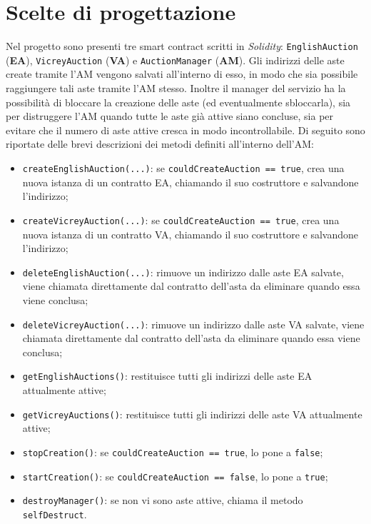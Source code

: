 \section{Scelte di progettazione}
Nel progetto sono presenti tre smart contract scritti in \textit{Solidity}: \texttt{EnglishAuction} (\textbf{EA}), \texttt{VicreyAuction} (\textbf{VA}) e \texttt{AuctionManager} (\textbf{AM}).
Gli indirizzi delle aste create tramite l'AM vengono salvati all'interno di esso, in modo che sia possibile raggiungere tali aste tramite l'AM stesso. Inoltre il manager del servizio ha la possibilità di bloccare la creazione delle aste (ed eventualmente sbloccarla), sia per distruggere l'AM quando tutte le aste già attive siano concluse, sia per evitare che il numero di aste attive cresca in modo incontrollabile. Di seguito sono riportate delle brevi descrizioni dei metodi definiti all'interno dell'AM:
\begin{itemize}
	\item \texttt{createEnglishAuction(...)}: se \texttt{couldCreateAuction == true}, crea una nuova istanza di un contratto EA, chiamando il suo costruttore e salvandone l'indirizzo;
	\item \texttt{createVicreyAuction(...)}: se \texttt{couldCreateAuction == true}, crea una nuova istanza di un contratto VA, chiamando il suo costruttore e salvandone l'indirizzo;
	\item \texttt{deleteEnglishAuction(...)}: rimuove un indirizzo dalle aste EA salvate, viene chiamata direttamente dal contratto dell'asta da eliminare quando essa viene conclusa;
	\item \texttt{deleteVicreyAuction(...)}: rimuove un indirizzo dalle aste VA salvate,  viene chiamata direttamente dal contratto dell'asta da eliminare quando essa viene conclusa;
	\item \texttt{getEnglishAuctions()}: restituisce tutti gli indirizzi delle aste EA attualmente attive;
	\item \texttt{getVicreyAuctions()}: restituisce tutti gli indirizzi delle aste VA attualmente attive;
	\item \texttt{stopCreation()}: se \texttt{couldCreateAuction == true}, lo pone a \texttt{false};
	\item \texttt{startCreation()}: se \texttt{couldCreateAuction == false}, lo pone a \texttt{true};
	\item \texttt{destroyManager()}: se non vi sono aste attive, chiama il metodo \texttt{selfDestruct}.
\end{itemize}
